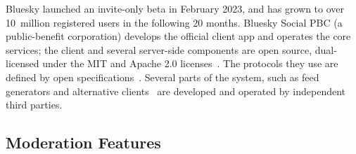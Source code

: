 \documentclass[sigconf]{acmart}
\newif\ifextendedversion
\begin{document}

Bluesky launched an invite-only beta in February 2023, and has grown to over 10~million registered users in the following 20 months. %
Bluesky Social PBC (a public-benefit corporation) develops the official client app and operates the core services; the client and several server-side components are open source, dual-licensed under the MIT and Apache 2.0 licenses~\cite{BlueskyGithub}.
The protocols they use are defined by open specifications~\cite{AtProtoSpecs}.
Several parts of the system, such as feed generators and alternative clients~\cite{AtProtoClients} are developed and operated by independent third parties.

\ifextendedversion
\subsection{Moderation Features}\label{sec:moderation}
\end{document}
